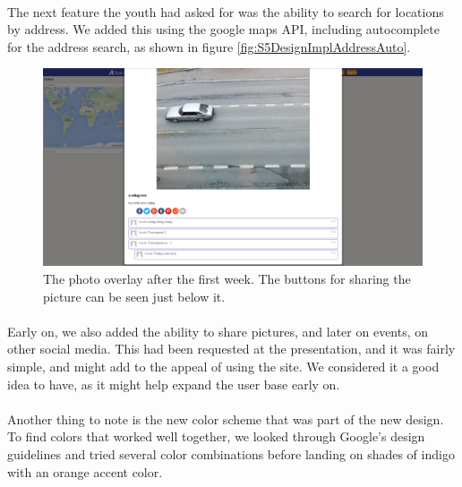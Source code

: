 \paragraph{} The next feature the youth had asked for was the ability to search for locations by address. We added this using the google maps API, including autocomplete for the address search, as shown in figure \ref{fig:S5DesignImplAddressAuto}.

\begin{figure}[ht!]
  \centering
  \includegraphics[width=\linewidth]{./img/webpage/27Oct/SinglePhoto27Oct}
  \caption{The photo overlay after the first week. The buttons for sharing the picture can be seen just below it.}
  \label{fig:S5DesignImplSinglePhoto27Oct}
\end{figure}

\paragraph{} Early on, we also added the ability to share pictures, and later on events, on other social media. This had been requested at the presentation, and it was fairly simple, and might add to the appeal of using the site. We considered it a good idea to have, as it might help expand the user base early on.

\paragraph{} Another thing to note is the new color scheme that was part of the new design. To find colors that worked well together, we looked through Google's design guidelines and tried several color combinations before landing on shades of indigo with an orange accent color.

